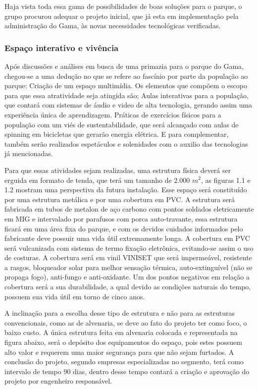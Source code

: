 	Haja vista toda essa gama de possibilidades de boas soluções para o parque, o grupo procurou adequar o projeto inicial, que já esta em implementação pela administração do Gama, às novas necessidades tecnológicas verificadas.

\subsubsection{Espaço interativo e vivência}

	Após discussões e análises em busca de uma primazia para o parque do Gama, chegou-se a uma dedução no que se refere ao fascínio por parte da população ao parque: Criação de um espaço multimídia.
Os elementos que compõem o escopo para que essa atratividade seja atingida são; Aulas interativas para a população, que contará com sistemas de áudio e video de alta tecnologia, gerando assim uma experiência única de aprendizagem. Práticas de exercícios físicos para a população com um viés de sustentabilidade, que será alcançado com aulas de spinning em bicicletas que gerarão energia elétrica. E para complementar, também serão realizados espetáculos e solenidades com o auxilio das tecnologias já mencionadas.

	Para que essas atividades sejam realizadas, uma estrutura física deverá ser erguida em formato de tenda, que terá um tamanho de 2.000 $m^{2}$, as figuras 1.1 e 1.2 mostram uma perspectiva da futura instalação. Esse espaço será constituído por uma estrutura metálica e por uma cobertura em PVC. A estrutura será fabricada em tubos de metalon de aço carbono com pontos soldados eletricamente em MIG e intervalado por parafusos com porca auto-travante, essa estrutura ficará em uma área fixa do parque, e com os devidos cuidados informados pelo fabricante deve possuir uma vida útil extremamente longa.
A cobertura em PVC será vulcanizada com sistema de termo fixação eletrônica, evitando-se assim o uso de costuras. A cobertura será em vinil VINISET que será impermeável, resistente a rasgos, bloqueador solar para melhor sensação térmica, auto-extinguível (não se propaga fogo), anti-fungo e anti-oxidante. Um dos pontos negativos em relação a cobertura será a sua durabilidade, a qual devido as condições naturais do tempo, possuem sua vida útil em torno de cinco anos.

	A inclinação para a escolha desse tipo de estrutura e não para as estruturas convencionais, como as de alvenaria, se deve ao fato do projeto ter como foco, o baixo custo. A única estrutura feita em alvenaria colocada e representada na figura abaixo, será o dep\'osito dos equipamentos do espaço, pois estes possuem alto valor e requerem uma maior segurança para que não sejam furtados. A conclusão do projeto, segundo empresas especializadas no segmento, terá como intervalo de tempo 90 dias, dentro desse tempo contará a criação e aprovação do projeto por engenheiro responsável.
	
